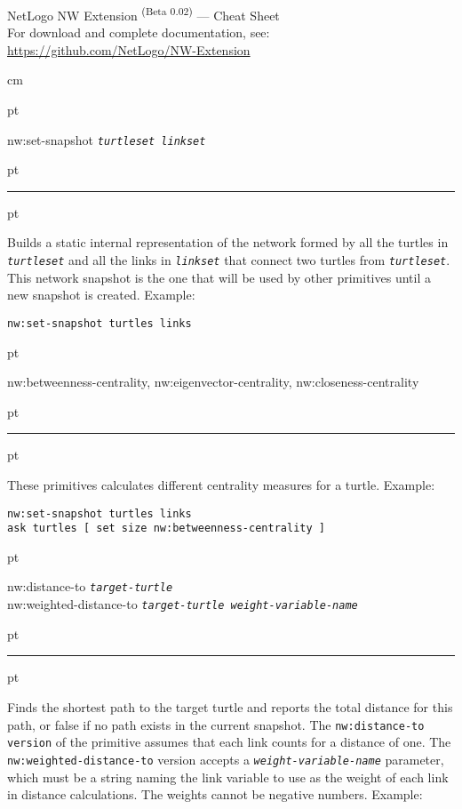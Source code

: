 \documentclass[10pt]{article}
\newenvironment{prim}{
  \leftskip 0cm
  \vskip 6 pt
  \ttfamily
  \bfseries
}{
  \vskip 2 pt
  \hrule
  \vskip 6 pt
}
\newcommand{\param}[1]{\texttt{\textit{\textmd{#1}}}}
\newcommand{\cat}[1]{\vspace{1 em}{\parindent -1cm \scshape \bfseries \large
#1}}
\begin{document}
{
  \begin{center}
  \Huge NetLogo NW Extension \textsuperscript{\small(Beta 0.02)} — Cheat Sheet
  \\
  \normalsize For download and complete documentation, see: \\
  \url{https://github.com/NetLogo/NW-Extension}
  \end{center}
  \vspace{1 em}
}

 cm

\cat{General Primitive}

\begin{prim}
nw:set-snapshot \param{turtleset linkset}
\end{prim}

Builds a static internal representation of the network formed by all the turtles
in \param{turtleset} and all the links in \param{linkset} that connect two
turtles from \param{turtleset}. This network snapshot is the one that will be used by
other primitives until a new snapshot is created. Example:
\begin{Verbatim}
nw:set-snapshot turtles links
\end{Verbatim}

\cat{Centrality Primitives}

\begin{prim}
nw:betweenness-centrality,
nw:eigenvector-centrality,
nw:closeness-centrality
\end{prim}

These primitives calculates different centrality measures for a turtle. Example:
\begin{Verbatim}
nw:set-snapshot turtles links
ask turtles [ set size nw:betweenness-centrality ]
\end{Verbatim}

\cat{Distance and Path-Finding Primitives}

\begin{prim}
nw:distance-to \param{target-turtle}\\
nw:weighted-distance-to \param{target-turtle weight-variable-name}
\end{prim}

Finds the shortest path to the target turtle and reports the total distance for
this path, or false if no path exists in the current snapshot. The
\texttt{nw:distance-to version} of the primitive assumes that each link counts
for a distance of one. The \texttt{nw:weighted-distance-to} version accepts a
\param{weight-variable-name} parameter, which must be a string naming the link
variable to use as the weight of each link in distance calculations. The weights cannot
be negative numbers. Example:
\end{document}
